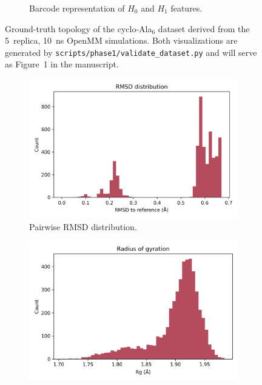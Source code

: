 \documentclass[11pt]{article}
\theoremstyle{definition}
\begin{document}
\begin{figure}[t]
\begin{subfigure}{0.48\linewidth}
        \caption{Barcode representation of $H_0$ and $H_1$ features.}
        \label{fig:phase1_barcode}
    \end{subfigure}
    \caption{Ground-truth topology of the cyclo-Ala$_6$ dataset derived from the 5~replica, 10~ns OpenMM simulations. Both visualizations are generated by \texttt{scripts/phase1/validate\_dataset.py} and will serve as Figure~1 in the manuscript.}
    \label{fig:phase1_topology}
\end{figure}

\begin{figure}[t]
    \centering
    \begin{subfigure}{0.32\linewidth}
        \centering
        \includegraphics[width=\linewidth]{../results/phase1/rmsd_distribution.png}
        \caption{Pairwise RMSD distribution.}
        \label{fig:phase1_rmsd}
    \end{subfigure}
    \hfill
    \begin{subfigure}{0.32\linewidth}
        \centering
        \includegraphics[width=\linewidth]{../results/phase1/rg_distribution.png}

\end{subfigure}
\end{figure}
\end{document}
